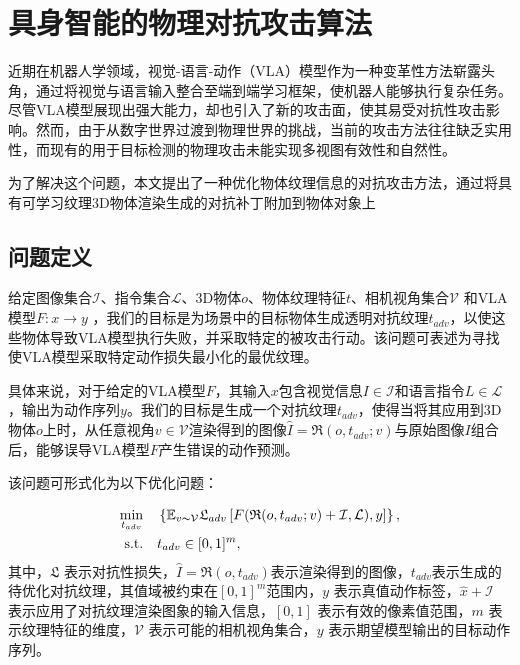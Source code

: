 \section{具身智能的物理对抗攻击算法}

近期在机器人学领域，视觉-语言-动作（VLA）模型作为一种变革性方法崭露头角，通过将视觉与语言输入整合至端到端学习框架，使机器人能够执行复杂任务。尽管VLA模型展现出强大能力，却也引入了新的攻击面，使其易受对抗性攻击影响。然而，由于从数字世界过渡到物理世界的挑战，当前的攻击方法往往缺乏实用性，而现有的用于目标检测的物理攻击未能实现多视图有效性和自然性。

为了解决这个问题，本文提出了一种优化物体纹理信息的对抗攻击方法，通过将具有可学习纹理3D物体渲染生成的对抗补丁附加到物体对象上
\subsection{问题定义}

给定图像集合$\mathcal{I} $、指令集合$\mathcal{L} $、3D物体$o$、物体纹理特征$t$、相机视角集合$\mathcal{V}$ 和VLA模型$F: x\rightarrow  y$ ，我们的目标是为场景中的目标物体生成透明对抗纹理$t_{adv}$，以使这些物体导致VLA模型执行失败，并采取特定的被攻击行动。该问题可表述为寻找使VLA模型采取特定动作损失最小化的最优纹理。

具体来说，对于给定的VLA模型$F$，其输入$x$包含视觉信息$I \in \mathcal{I}$和语言指令$L \in \mathcal{L}$，输出为动作序列$y$。我们的目标是生成一个对抗纹理$t_{adv}$，使得当将其应用到3D物体$o$上时，从任意视角$v \in \mathcal{V}$渲染得到的图像$\hat{I} = \mathfrak{R}(o, t_{adv}; v)$与原始图像$I$组合后，能够误导VLA模型$F$产生错误的动作预测。

该问题可形式化为以下优化问题：

\begin{equation}
    \begin{aligned}
    \min_{t_{adv}} &\quad \left\{\mathbb{E}_{v \thicksim  \mathcal{V} } \mathfrak{L} _{adv}\left[ F (\mathfrak{R}  (o, t_{adv}; v )+\mathcal{I}, \mathcal{L} ), y \right ] \right\},\\
    \mathrm{s.t.} &\quad t_{adv} \in [0,1]^m,
    \end{aligned}
\end{equation}
其中，$\mathfrak{L}$ 表示对抗性损失，$\hat {I}=\mathfrak{R} (o, t_{adv})$表示渲染得到的图像，$t_{adv}$表示生成的待优化对抗纹理，其值域被约束在$[0,1]^m$范围内，$y$ 表示真值动作标签，$\hat{x}+\mathcal{I}$ 表示应用了对抗纹理渲染图象的输入信息，$[0,1]$ 表示有效的像素值范围，$m$ 表示纹理特征的维度，$\mathcal{V}$ 表示可能的相机视角集合，$y$ 表示期望模型输出的目标动作序列。

